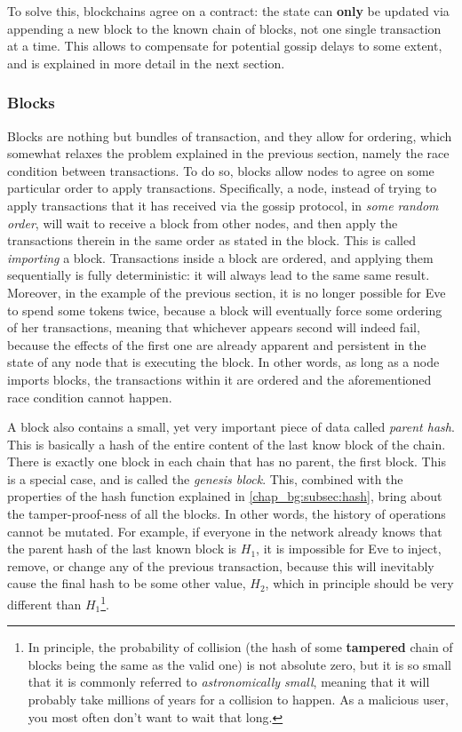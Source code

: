 To solve this, blockchains agree on a contract: the state can \textbf{only} be updated via appending
a new block to the known chain of blocks, not one single transaction at a time. This allows to
compensate for potential gossip delays to some extent, and is explained in more detail in the next
section.

\subsubsection{Blocks} \label{chap_bg:subsec:block}

Blocks are nothing but bundles of transaction, and they allow for ordering, which somewhat relaxes
the problem explained in the previous section, namely the race condition between transactions. To do
so, blocks allow nodes to agree on some particular order to apply transactions. Specifically, a
node, instead of trying to apply transactions that it has received via the gossip protocol, in
\textit{some random order}, will wait to receive a block from other nodes, and then apply the
transactions therein in the same order as stated in the block. This is called \textit{importing} a
block. Transactions inside a block are ordered, and applying them sequentially is fully
deterministic: it will always lead to the same same result. Moreover, in the example of the previous
section, it is no longer possible for Eve to spend some tokens twice, because a block will
eventually force some ordering of her transactions, meaning that whichever appears second will
indeed fail, because the effects of the first one are already apparent and persistent in the state
of any node that is executing the block. In other words, as long as a node imports blocks, the
transactions within it are ordered and the aforementioned race condition cannot happen.

A block also contains a small, yet very important piece of data called \textit{parent hash}. This is
basically a hash of the entire content of the last know block of the chain. There is exactly one
block in each chain that has no parent, the first block. This is a special case, and is called the
\textit{genesis block}. This, combined with the properties of the hash function explained in
\ref{chap_bg:subsec:hash}, bring about the tamper-proof-ness of all the blocks. In other words, the
history of operations cannot be mutated. For example, if everyone in the network already knows that
the parent hash of the last known block is $H_1$, it is impossible for Eve to inject, remove, or
change any of the previous transaction, because this will inevitably cause the final hash to be some
other value, $H_2$, which in principle should be very different than $H_1$\footnote{In principle,
the probability of collision (the hash of some \textbf{tampered} chain of blocks being the same as
the valid one) is not absolute zero, but it is so small that it is commonly referred to
\textit{astronomically small}, meaning that it will probably take millions of years for a collision
to happen. As a malicious user, you most often don't want to wait that long.}.

